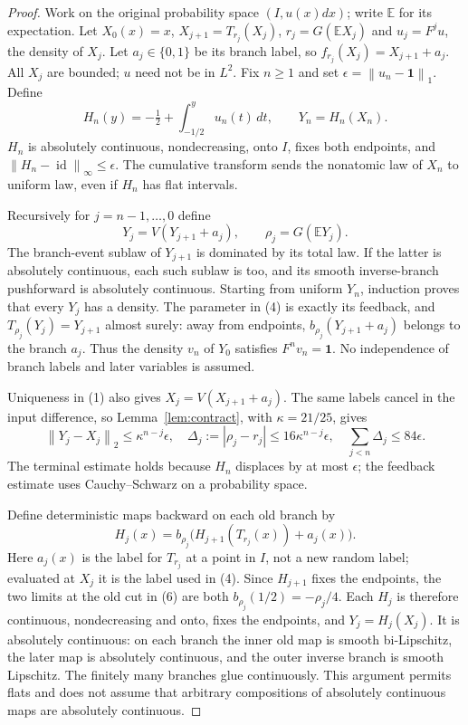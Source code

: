 \documentclass[11pt]{article}
\newcommand{\E}{\mathbb E}
\newcommand{\norm}[1]{\left\lVert#1\right\rVert}
\newcommand{\one}{\mathbf 1}
\DeclareMathOperator{\id}{id}
\begin{document}
\begin{proof}
Work on the original probability space $(I,u(x)dx)$; write $\E$ for its
expectation. Let $X_0(x)=x$, $X_{j+1}=T_{r_j}(X_j)$,
$r_j=G(\E X_j)$ and $u_j=F^ju$, the density of $X_j$.
Let $a_j\in\{0,1\}$ be its branch label, so
$f_{r_j}(X_j)=X_{j+1}+a_j$. All $X_j$ are bounded; $u$ need not be in $L^2$.
Fix $n\ge1$ and set $\epsilon=\norm{u_n-\one}_1$. Define
\[
 H_n(y)=-\tfrac12+\int_{-1/2}^y u_n(t)\,dt,\qquad Y_n=H_n(X_n).
\]
$H_n$ is absolutely continuous, nondecreasing, onto $I$, fixes both endpoints,
and $\norm{H_n-\id}_\infty\le\epsilon$.
The cumulative transform sends the nonatomic law of $X_n$ to uniform law,
even if $H_n$ has flat intervals.

Recursively for $j=n-1,\ldots,0$ define
\[
 Y_j=V(Y_{j+1}+a_j),\qquad \rho_j=G(\E Y_j).
                                                               \tag{4}\label{eq:back}
\]
The branch-event sublaw of $Y_{j+1}$ is dominated by its total law. If the
latter is absolutely continuous, each such sublaw is too, and its smooth
inverse-branch pushforward is absolutely continuous. Starting from uniform
$Y_n$, induction proves that every $Y_j$ has a density. The parameter in
(4) is exactly its feedback, and $T_{\rho_j}(Y_j)=Y_{j+1}$ almost surely:
away from endpoints, $b_{\rho_j}(Y_{j+1}+a_j)$ belongs to the branch $a_j$.
Thus the density $v_n$ of $Y_0$ satisfies $F^nv_n=\one$. No independence of
branch labels and later variables is assumed.

Uniqueness in (1) also gives $X_j=V(X_{j+1}+a_j)$. The same labels cancel
in the input difference, so Lemma~\ref{lem:contract}, with $\kappa=21/25$,
gives
\[
 \norm{Y_j-X_j}_2\le\kappa^{n-j}\epsilon,
 \quad\Delta_j:=|\rho_j-r_j|\le16\kappa^{n-j}\epsilon,
 \quad \sum_{j<n}\Delta_j\le84\epsilon.              \tag{5}\label{eq:delta}
\]
The terminal estimate holds because $H_n$ displaces by at most $\epsilon$;
the feedback estimate uses Cauchy--Schwarz on a probability space.

Define deterministic maps backward on each old branch by
\[
 H_j(x)=b_{\rho_j}\bigl(H_{j+1}(T_{r_j}(x))+a_j(x)\bigr).
                                                               \tag{6}\label{eq:H}
\]
Here $a_j(x)$ is the label for $T_{r_j}$ at a point in $I$, not a new random
label; evaluated at $X_j$ it is the label used in (4).
Since $H_{j+1}$ fixes the endpoints, the two limits at the old cut in (6)
are both $b_{\rho_j}(1/2)=-\rho_j/4$. Each $H_j$ is therefore continuous,
nondecreasing and onto, fixes the endpoints, and $Y_j=H_j(X_j)$.
It is absolutely continuous: on each branch the inner old map is smooth
bi-Lipschitz, the later map is absolutely continuous, and the outer inverse
branch is smooth Lipschitz. The finitely many branches glue continuously.
This argument permits flats and does not assume that arbitrary compositions
of absolutely continuous maps are absolutely continuous.


\end{proof}
\end{document}
